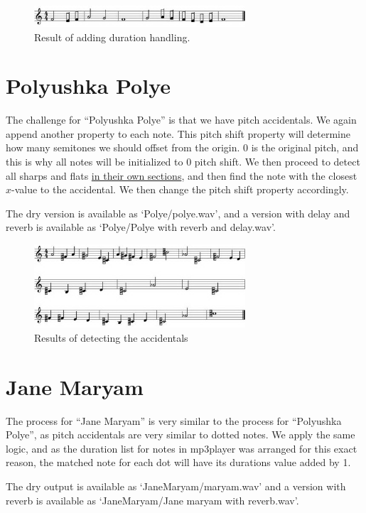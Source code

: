 \documentclass[12pt]{article}
\begin{document}
\begin{figure}[h!]
    \centering
    \includegraphics[width=0.7\textwidth]{detected ave.JPG}
    \caption{Result of adding duration handling.}
    \label{fig:4}
\end{figure}

\section{Polyushka Polye}
The challenge for ``Polyushka Polye'' is that we have pitch accidentals. We again append another property to each note.
This pitch shift property will determine how many semitones we should offset from the origin. 0 is the original pitch,
and this is why all notes will be initialized to 0 pitch shift. We then proceed to detect all sharps and flats \underline{in their own
sections}, and then find the note with the closest $x$-value to the accidental. We then change the pitch shift property accordingly.


The dry version is available as `Polye/polye.wav', and a version with delay and reverb is available
as `Polye/Polye with reverb and delay.wav'.
\begin{figure}[h!]
    \centering
    \includegraphics[width=0.7\textwidth]{detected polye.jpg}
    \caption{Results of detecting the accidentals}
    \label{fig:5}
\end{figure}

\section{Jane Maryam}
The process for ``Jane Maryam'' is very similar to the process for ``Polyushka Polye'', as pitch accidentals are very similar to dotted notes.
We apply the same logic, and as the duration list for notes in mp3player was arranged for this exact reason, the matched note for each dot
will have its durations value added by 1.

The dry output is available as `JaneMaryam/maryam.wav' and a version with reverb is available
as `JaneMaryam/Jane maryam with reverb.wav'.

\makeendpage
\end{document}
